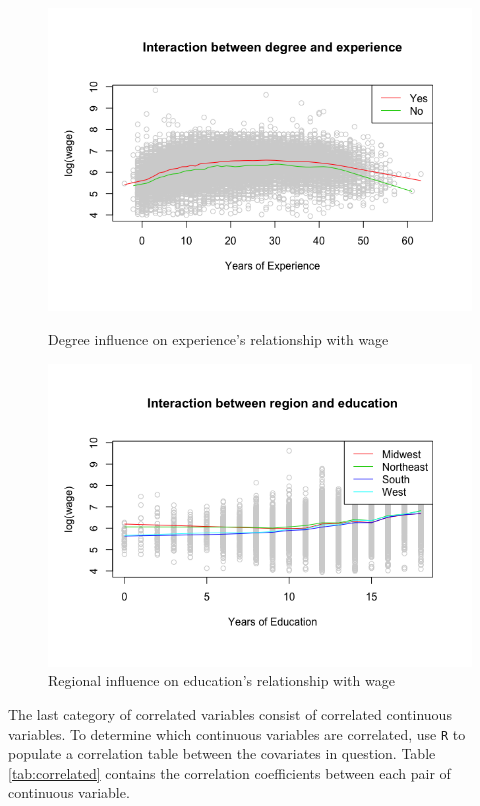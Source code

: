 \documentclass{article}
\begin{document}
\begin{figure}
\begin{minipage}{.45\textwidth}
          \includegraphics[scale=0.35]{interaction/degexp}
          \caption{Degree influence on experience's relationship with wage}
          \label{fig:interactioncdegexp}

          \includegraphics[scale=0.35]{interaction/regedu}
          \caption{Regional influence on education's relationship with wage}
          \label{fig:interactionregedu}
        \end{minipage}
      \end{figure}

      The last category of correlated variables consist of correlated continuous
      variables. To determine which continuous variables are correlated,
      use \texttt{R} to populate a correlation table between the covariates
      in question. Table \ref{tab:correlated} contains the correlation coefficients
      between each pair of continuous variable.
\end{document}
